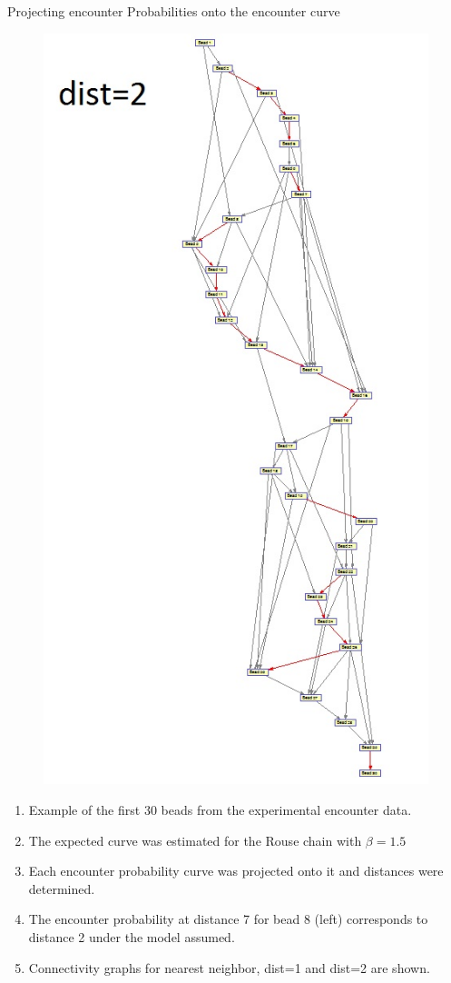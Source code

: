 \documentclass[8pt]{beamer}
\begin{document}
\begin{frame}{Projecting encounter Probabilities onto the encounter curve}
\begin{figure}[H]
\includegraphics[scale=0.15]{connectivityGraph30BeadsDistance2}
\end{figure}
\begin{enumerate}
\item Example of the first 30 beads from the experimental encounter data.
\item The expected curve was estimated for the Rouse chain with $\beta=1.5$
\item Each encounter probability curve was projected onto it and distances were determined.
\item The encounter probability at distance 7 for bead 8 (left) corresponds to distance 2 under the model assumed.
\item Connectivity graphs for nearest neighbor, dist=1 and dist=2 are shown. 
\end{enumerate}

\end{frame}
\end{document}

